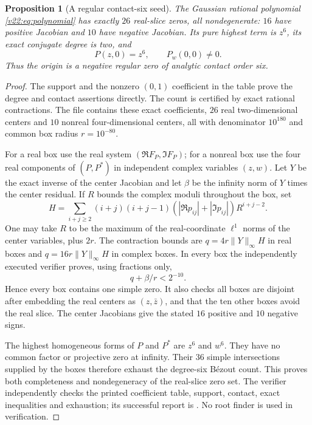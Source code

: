 \documentclass[UTF8,11pt]{ctexart}
\newtheorem{prop}[thm]{Proposition}
\theoremstyle{definition}
\numberwithin{equation}{section}
\begin{document}
\begin{prop}[A regular contact-six seed]\label{v22:prop:contact26}
The Gaussian rational polynomial \eqref{v22:eq:polynomial} has
exactly $26$ real-slice zeros, all nondegenerate: $16$ have positive
Jacobian and $10$ have negative Jacobian. Its pure highest term is
$z^6$, its exact conjugate degree is two, and
\[
 P(z,0)=z^6,\qquad P_w(0,0)\ne0.
\]
Thus the origin is a negative regular zero of analytic contact order six.
\end{prop}
\begin{proof}
The support and the nonzero $(0,1)$ coefficient in the table prove
the degree and contact assertions directly. The count is certified
by exact rational contractions. The file
 contains these exact
coefficients, $26$ real two-dimensional centers and $10$ nonreal
four-dimensional centers, all with denominator $10^{180}$ and
common box radius $r=10^{-80}$.

For a real box use the real system $(\Re F_P,\Im F_P)$; for a
nonreal box use the four real components of $(P,P^*)$ in independent
complex variables $(z,w)$. Let $Y$ be the exact inverse of the center
Jacobian and let $\beta$ be the infinity norm of $Y$ times the center
residual. If $R$ bounds the complex moduli throughout the box, set
\[
 H=\sum_{i+j\ge2}(i+j)(i+j-1)
       (|\Re p_{ij}|+|\Im p_{ij}|)R^{i+j-2}.
\]
One may take $R$ to be the maximum of the real-coordinate
$\ell^1$ norms of the center variables, plus $2r$.
The contraction bounds are $q=4r\|Y\|_\infty H$ in real boxes
and $q=16r\|Y\|_\infty H$ in complex boxes. In every box the
independently executed verifier proves, using fractions only,
\[
                 q+\beta/r<2^{-10}.
\]
Hence every box contains one simple zero. It also checks all boxes
are disjoint after embedding the real centers as $(z,\bar z)$,
and that the ten other boxes avoid the real slice. The center
Jacobians give the stated $16$ positive and $10$ negative signs.

The highest homogeneous forms of $P$ and $P^*$ are $z^6$ and $w^6$.
They have no common factor or projective zero at infinity.
Their $36$ simple intersections supplied by the boxes therefore
exhaust the degree-six B\'ezout count. This proves both completeness
and nondegeneracy of the real-slice zero set. The verifier
 independently checks the printed
coefficient table, support, contact, exact inequalities and exhaustion;
its successful report is .
No root finder is used in verification.
\end{proof}
\end{document}
